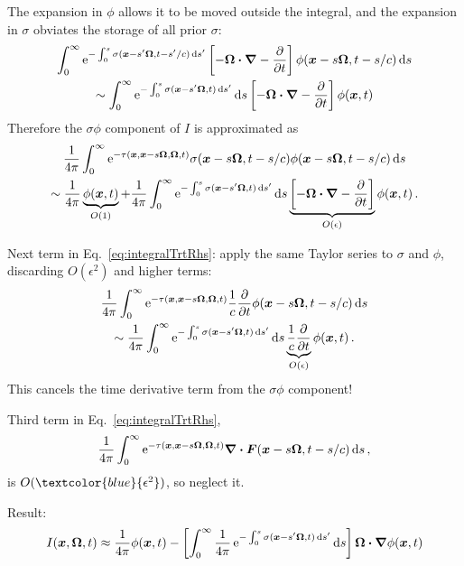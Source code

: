 \documentclass{beamer}
\newcommand{\epsiloncolor}[1]{\textcolor{blue}{#1}}
\begin{document}
\begin{frame}
 The expansion in $\phi$ allows it to be moved outside the integral, and the
 expansion in $\sigma$ obviates the storage of all prior $\sigma$:
\begin{multline*}
  \int_{0}^{\infty} \mathop{}\!\mathrm{e}^{- \int_{0}^{s} \sigma(\bm{x}-s'\bm{\Omega}, t-s'/c) \mathop{}\!\mathrm{d} s'}
\left[ -\bm{\Omega} \bm{\cdot} \bm{\nabla} - \frac{\partial }{\partial t} \right] \phi(\bm{x} - s \bm{\Omega}, t-s/c)
\mathop{}\!\mathrm{d} s
\\
\sim \int_{0}^{\infty} \mathop{}\!\mathrm{e}^{- \int_{0}^{s} \sigma(\bm{x}-s'\bm{\Omega}, t)
\mathop{}\!\mathrm{d} s'} \mathop{}\!\mathrm{d} s
\left[ -\bm{\Omega} \bm{\cdot} \bm{\nabla} - \frac{\partial }{\partial t} \right] \phi(\bm{x}, t)
\end{multline*}
Therefore the $\sigma\phi$ component of $I$ is approximated as
\begin{multline*}
  \frac{1}{4\pi}\int_{0}^{\infty} \mathop{}\!\mathrm{e}^{ -\tau(\bm{x}, \bm{x} - s
  \bm{\Omega}, \bm{\Omega}, t)} \sigma(\bm{x} - s \bm{\Omega}, t-s/c)
  \phi(\bm{x} - s \bm{\Omega}, t-s/c) \mathop{}\!\mathrm{d} s
  \\
  \sim 
  \frac{1}{4\pi}\underbrace{\phi(\bm{x}, t)}_{O(1)}
  + \frac{1}{4\pi}\int_{0}^{\infty} \mathop{}\!\mathrm{e}^{- \int_{0}^{s} \sigma(\bm{x}-s'\bm{\Omega}, t)
\mathop{}\!\mathrm{d} s'} \mathop{}\!\mathrm{d} s
\underbrace{\left[ -\bm{\Omega} \bm{\cdot} \bm{\nabla} - \frac{\partial }{\partial t} \right]}_{O(\epsilon)} \phi(\bm{x}, t)\,.
\end{multline*}
\end{frame}
\begin{frame}
  Next term in Eq.~\eqref{eq:integralTrtRhs}: apply the same Taylor series to
  $\sigma$ and $\phi$, discarding $O(\epsilon^2)$ and higher terms:
\begin{multline*}
  \frac{1}{4\pi}\int_{0}^{\infty} \mathop{}\!\mathrm{e}^{ -\tau(\bm{x}, \bm{x} - s
  \bm{\Omega}, \bm{\Omega}, t)}
  \frac{1}{c} \frac{\partial }{\partial t}\phi(\bm{x} - s \bm{\Omega}, t-s/c) \mathop{}\!\mathrm{d} s
 \\
 \sim 
  \frac{1}{4\pi}\int_{0}^{\infty} \mathop{}\!\mathrm{e}^{- \int_{0}^{s} \sigma(\bm{x}-s'\bm{\Omega}, t)
  \mathop{}\!\mathrm{d} s'} \mathop{}\!\mathrm{d} s
  \underbrace{\frac{1}{c} \frac{\partial }{\partial t}}_{O(\epsilon)}\phi(\bm{x}, t)\,.
\end{multline*}
This cancels the time derivative term from the $\sigma\phi$ component!

Third term in Eq.~\eqref{eq:integralTrtRhs},
  \begin{equation*}
    \frac{1}{4\pi}\int_{0}^{\infty} \mathop{}\!\mathrm{e}^{ -\tau(\bm{x}, \bm{x} - s
    \bm{\Omega}, \bm{\Omega}, t)}
    \bm{\nabla} \bm{\cdot} \bm{F}(\bm{x} - s \bm{\Omega}, t-s/c) \mathop{}\!\mathrm{d} s\,,
  \end{equation*}
is $O(\epsiloncolor{\epsilon^2})$, so neglect it.

Result: 
\begin{equation} \label{eq:anisotropicIntensity}
  I(\bm{x}, \bm{\Omega}, t) \approx
  \frac{1}{4\pi}\phi(\bm{x}, t) - \left[ \int_{0}^{\infty} \frac{1}{4\pi}
  \mathop{}\!\mathrm{e}^{- \int_{0}^{s} \sigma(\bm{x}-s'\bm{\Omega}, t)
  \mathop{}\!\mathrm{d} s'} \mathop{}\!\mathrm{d} s\right]
\bm{\Omega} \bm{\cdot} \bm{\nabla} \phi(\bm{x}, t)
\end{equation}
\end{frame}
\end{document}
